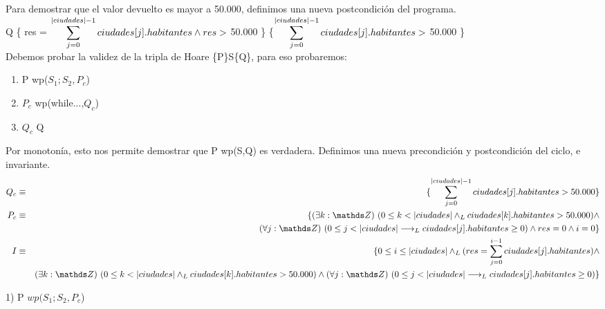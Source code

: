 \documentclass[10pt,a4paper,fleqn]{article}
\begin{document}
\subsection{}
Para demostrar que el valor devuelto es mayor a 50.000, definimos una nueva postcondición del programa. 
\vspace{2,5mm}\\
Q \equiv \{ res = $\small \displaystyle \sum_{j=0}^{|ciudades|-1} ciudades[j].habitantes \land res >$ 50.000 \} \equiv \{$\small \displaystyle \sum_{j=0}^{|ciudades|-1} ciudades[j].habitantes >$ 50.000 \}\\
Debemos probar la validez de la tripla de Hoare \{P\}S\{Q\}, para eso probaremos:
\begin{enumerate}
    \item P \implica wp($S_1;S_2, P_c$)
    \item $P_c$ \implica wp(while...,$Q_c$)
    \item $Q_c$ \implica Q
\end{enumerate}
Por monotonía, esto nos permite demostrar que P \implica wp(S,Q) es verdadera. Definimos una nueva precondición y postcondición del ciclo, e invariante.\\
\begin{eqnarray}
    Q_c &\equiv& \{\small \displaystyle \sum_{j=0}^{|ciudades|-1} ciudades[j].habitantes > 50.000\} \notag \\
    P_c &\equiv& \{ \existe[unalinea]{k}{\ent}{0 \leq k< |ciudades| \yLuego ciudades[k].habitantes >  50.000 }\land \notag \\ 
    & & \paraTodo[unalinea]{j}{\ent}{0\leq j < |ciudades| \implicaLuego ciudades[j].habitantes \geq 0} \land res=0 \land i=0 \} \notag \\
    I &\equiv& \{ 0 \leq i \leq |ciudades| \yLuego (res = \small \displaystyle \sum_{j=0}^{i-1} ciudades[j].habitantes) \land \notag \\
    & & \existe[unalinea]{k}{\ent}{0 \leq k< |ciudades| \yLuego ciudades[k].habitantes >  50.000 }\land \paraTodo[unalinea]{j}{\ent}{0 \leq j < |ciudades| \implicaLuego ciudades[j].habitantes \geq 0} \} \notag 
\end{eqnarray}
\item 1) P \implica $wp(S_1;S_2, P_c$)\\ \vspace{-10mm}
\end{document}

